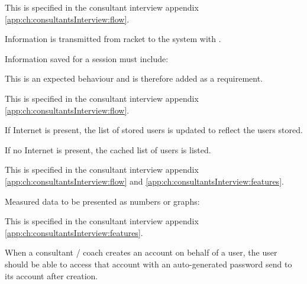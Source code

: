 
This  is specified in the consultant interview appendix \ref{app:ch:consultantsInterview:flow}.

Information is transmitted from racket to the system with .

Information saved for a session must include: \newline
{}


This is an expected behaviour and is therefore added as a requirement.


This  is specified in the consultant interview appendix \ref{app:ch:consultantsInterview:flow}.

If Internet is present, the list of stored users is updated to reflect the users stored.

If no Internet is present, the cached list of users is listed.


This  is specified in the consultant interview appendix \ref{app:ch:consultantsInterview:flow} and \ref{app:ch:consultantsInterview:features}.

Measured data to be presented as numbers or graphs: \newline
{}


This  is specified in the consultant interview appendix \ref{app:ch:consultantsInterview:features}.

When a consultant / coach creates an account on behalf of a user, the user should be able to access that account with an auto-generated password send to its account after creation.

